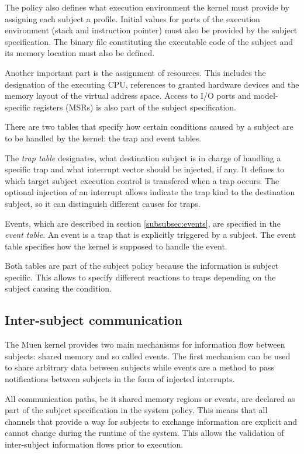 The policy also defines what execution environment the kernel must provide by
assigning each subject a profile. Initial values for parts of the execution
environment (stack and instruction pointer) must also be provided by the subject
specification. The binary file constituting the executable code of the subject
and its memory location must also be defined.

Another important part is the assignment of resources. This includes the
designation of the executing CPU, references to granted hardware devices and the
memory layout of the virtual address space. Access to I/O ports and
model-specific registers (MSRs) is also part of the subject specification.

There are two tables that specify how certain conditions caused by a subject
are to be handled by the kernel: the trap and event tables.

The \emph{trap table} designates, what destination subject is in charge of
handling a specific trap and what interrupt vector should be injected, if any.
It defines to which target subject execution control is transfered when a trap
occurs. The optional injection of an interrupt allows indicate the trap kind
to the destination subject, so it can distinguish different causes for traps.

Events, which are described in section \ref{subsubsec:events}, are specified in
the \emph{event table}. An event is a trap that is explicitly triggered by a
subject. The event table specifies how the kernel is supposed to handle the
event.

Both tables are part of the subject policy because the information is subject
specific. This allows to specify different reactions to traps depending on the
subject causing the condition.

\subsection{Inter-subject communication}
The Muen kernel provides two main mechanisms for information flow between
subjects: shared memory and so called events. The first mechanism can be used
to share arbitrary data between subjects while events are a method to pass
notifications between subjects in the form of injected interrupts.

All communication paths, be it shared memory regions or events, are declared as
part of the subject specification in the system policy. This means that all
channels that provide a way for subjects to exchange information are explicit
and cannot change during the runtime of the system. This allows the validation
of inter-subject information flows prior to execution.

